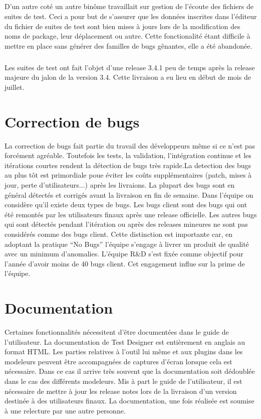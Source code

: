 \subparagraph*{}
D'un autre coté un autre binôme travaillait sur gestion de l'écoute des fichiers de suites de test. Ceci a pour but de s'assurer que les données inscrites dans l'éditeur du fichier de suites de test sont bien mises à jours lors de la modification des noms de package, leur déplacement ou autre. Cette fonctionalité étant difficile à mettre en place sans générer des familles de bugs gênantes, elle a été abandonée.
\subparagraph*{}
Les suites de test ont fait l'objet d'une release 3.4.1 peu de temps après la release majeure du jalon de la version 3.4. Cette livraison a eu lieu en début de mois de juillet.
\section{Correction de bugs}
La correction de bugs fait partie du travail des développeurs même si ce n'est pas forcément agréable. Toutefois les tests, la validation, l'intégration continue et les itérations courtes rendent la détection de bugs très rapide.La detection des bugs au plus tôt est primordiale poue éviter les coûts supplémentaires (patch, mises à jour, perte d'utilisateurs...) après les livraions. La plupart des bugs sont en général détectés et corrigés avant la livraison en fin de semaine. Dans l'équipe on considère qu'il existe deux types de bugs. Les bugs client sont des bugs qui ont été remontés par les utilisateurs finaux après une release officielle. Les autres bugs qui sont détectés pendant l'itération ou après des releases mineures ne sont pas considérés comme des bugs client. Cette distinction est importante car, en adoptant la pratique ``No Bugs'' l'équipe s'engage à livrer un produit de qualité avec un minimum d'anomalies. L'équipe R\&D s'est fixée comme objectif pour l'année d'avoir moins de 40 bugs client. Cet engagement influe sur la prime de l'équipe.
\section{Documentation}
Certaines fonctionnalités nécessitent d'être documentées dans le guide de l'utilisateur. La documentation de Test Designer est entièrement en anglais au format HTML. Les parties relatives à l'outil lui même et aux plugins dans les modeleurs peuvent être accompagnées de captures d'écran lorsque cela est nécessaire. Dans ce cas il arrive très souvent que la documentation soit dédoublée dans le cas des différents modeleurs. Mis à part le guide de l'utilisateur, il est nécessaire de mettre à jour les release notes lors de la livraison d'un version destinée à des utilisateurs finaux. La documentation, une fois réalisée est soumise à une relecture par une autre personne.
